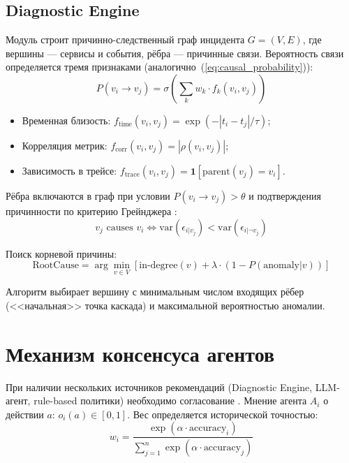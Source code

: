 \subsection{Diagnostic Engine}

Модуль строит причинно-следственный граф инцидента $G = (V, E)$, где вершины --- сервисы и события, рёбра --- причинные связи. Вероятность связи определяется тремя признаками (аналогично~(\ref{eq:causal_probability})):
\begin{equation}
P(v_i \to v_j) = \sigma\left(\sum_{k} w_k \cdot f_k(v_i, v_j)\right)
\label{eq:causal_probability_arch}
\end{equation}
\begin{itemize}
    \item Временная близость: $f_{\text{time}}(v_i, v_j) = \exp(-|t_i - t_j|/\tau)$;
    \item Корреляция метрик: $f_{\text{corr}}(v_i, v_j) = |\rho(v_i, v_j)|$;
    \item Зависимость в трейсе: $f_{\text{trace}}(v_i, v_j) = \mathbf{1}[\text{parent}(v_j) = v_i]$.
\end{itemize}

Рёбра включаются в граф при условии $P(v_i \to v_j) > \theta$ и подтверждения причинности по критерию Грейнджера \cite{granger_causality}:
\begin{equation}
v_j \text{ causes } v_i \Leftrightarrow \text{var}(\epsilon_{i|v_j}) < \text{var}(\epsilon_{i|\neg v_j})
\label{eq:granger_causality_arch}
\end{equation}

Поиск корневой причины:
\begin{equation}
\text{RootCause} = \arg\min_{v \in V} \left[ \text{in-degree}(v) + \lambda \cdot (1 - P(\text{anomaly}|v)) \right]
\label{eq:root_cause}
\end{equation}

Алгоритм выбирает вершину с минимальным числом входящих рёбер (<<начальная>> точка каскада) и максимальной вероятностью аномалии.

\section{Механизм консенсуса агентов}

При наличии нескольких источников рекомендаций (Diagnostic Engine, LLM-агент, rule-based политики) необходимо согласование \cite{wooldridge_agents,herlihy_art_multiprocessor}. Мнение агента $A_i$ о действии $a$: $o_i(a) \in [0, 1]$. Вес определяется исторической точностью:
\begin{equation}
w_i = \frac{\exp(\alpha \cdot \text{accuracy}_i)}{\sum_{j=1}^{n} \exp(\alpha \cdot \text{accuracy}_j)}
\label{eq:agent_weight}
\end{equation}

